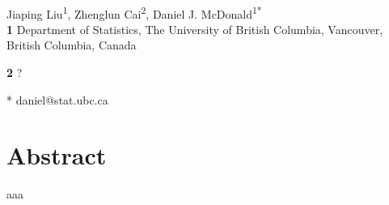 \documentclass[10pt,letterpaper]{article}
\begin{document}
\vspace*{0.2in}

\begin{flushleft}
{\Large
\textbf{} %
}
\newline
\\
Jiaping Liu\textsuperscript{1},
Zhenglun Cai\textsuperscript{2},
Daniel J. McDonald\textsuperscript{1*}
\\
\bigskip
\textbf{1} Department of Statistics, The University of British Columbia, Vancouver, British Columbia, Canada

\textbf{2} ? 
\\
\bigskip

% 
%





* daniel@stat.ubc.ca

\end{flushleft}
\section*{Abstract}
aaa
\end{document}
